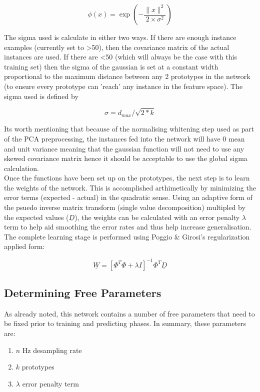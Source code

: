 \documentclass[twocolumn]{article}
\begin{document}
\[
 \phi(x) = \exp(-\frac{\|x\|^2}{2 \times \sigma^2})
\]

The sigma used is calculate in either two ways. If there are enough instance examples (currently set to \textgreater 50), then the covariance 
matrix of the actual instances are used. If there are \textless 50 (which will always be the case with this training set) then the sigma of the
gaussian is set at a constant width proportional to the maximum distance between any 2 prototypes in the network (to ensure every prototype can
'reach' any instance in the feature space). The sigma used is defined by 

\[
\sigma = d_{max} / \sqrt{2 * k}
\]

Its worth mentioning that because of the normalising whitening step used as part of the PCA preprocessing, the instances fed into the network will
have 0 mean and unit variance meaning that the gaussian function will not need to use any skewed covariance matrix hence it should be acceptable
to use the global sigma calculation.\\
Once the functions have been set up on the prototypes, the next step is to learn the weights of the network. This is accomplished arthimetically
by minimizing the error terms (expected - actual) in the quadratic sense. Using an adaptive form of the psuedo inverse matrix transform (single
value decomposition) multipled by the expected values ($\underline{D}$), the weights can be calculated with an error penalty $\lambda$ term to help 
aid smoothing the error rates and thus help increase generalisation. The complete learning stage is performed using Poggio \& Girosi's 
regularization applied form\cite{poggio}:

\[
\underline{W} = [\Phi^T \Phi + \lambda I]^{-1} \Phi^T \underline{D}
\]

\subsection{Determining Free Parameters}
As already noted, this network contains a number of free parameters that need to be fixed prior to training and predicting phases.
In summary, these parameters are:

\begin{enumerate}
	\item $n$ Hz desampling rate
	\item $k$ prototypes
	\item $\lambda$ error penalty term
\end{enumerate}
\end{document}

